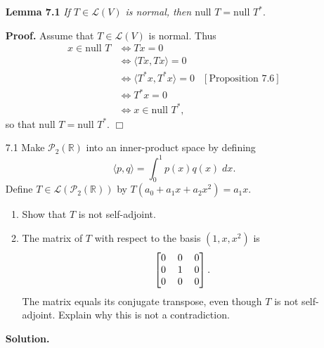 \documentclass[9pt]{article}
\newcommand{\qed}{\hfill \ensuremath{\Box}}
\newcommand{\R}{\mathbb{R}}
\newcommand{\cyc}[1]{\langle #1 \rangle}
\begin{document}
\begin{enumerate}
   \item[\textbf{Lemma 7.1}]  \textit{If $T \in \mathcal{L}(V)$ is normal, then
                              $\text{null }T = \text{null }T^*$}.

      \textbf{Proof.} Assume that $T \in \mathcal{L}(V)$ is normal. Thus
      \begin{align*}
         x \in \text{null }T &\Longleftrightarrow Tx = 0 \\
         &\Longleftrightarrow \cyc{Tx, Tx} = 0 \\
         &\Longleftrightarrow \cyc{T^*x, T^*x} = 0 &[\text{Proposition }7.6] \\
         &\Longleftrightarrow T^*x = 0 \\
         &\Longleftrightarrow x \in \text{null }T^*,
      \end{align*}
      so that $\text{null }T = \text{null }T^*$. \qed
   \item[7.1]  Make $\mathcal{P}_2(\R)$ into an inner-product space by defining
               $$\cyc{p, q} = \int_0^1p(x)q(x)\;dx.$$
               Define $T \in \mathcal{L}(\mathcal{P}_2(\R))$ by
               $T(a_0 + a_1x + a_2x^2) = a_1x$.
               \begin{enumerate}
                  \item Show that $T$ is not self-adjoint.
                  \item The matrix of $T$ with respect to the basis
                        $(1, x, x^2)$ is
                        $$\left[\begin{tabular}{@{}c c c@{}}
                           0 & 0 & 0 \\
                           0 & 1 & 0 \\
                           0 & 0 & 0
                        \end{tabular}\right].$$
                        The matrix equals its conjugate transpose, even though
                        $T$ is not self-adjoint. Explain why this is not a
                        contradiction.
               \end{enumerate}
               
      \textbf{Solution.}
      

\end{enumerate}
\end{document}
